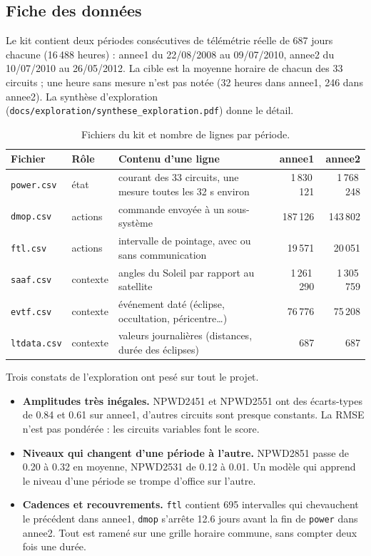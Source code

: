\documentclass[11pt,a4paper]{article}
\newcommand{\code}[1]{\texttt{#1}}
\begin{document}
\subsection{Fiche des données}

Le kit contient deux périodes consécutives de télémétrie réelle de 687 jours chacune (16\,488 heures) : annee1 du 22/08/2008 au 09/07/2010, annee2 du 10/07/2010 au 26/05/2012. La cible est la moyenne horaire de chacun des 33 circuits ; une heure sans mesure n'est pas notée (32 heures dans annee1, 246 dans annee2). La synthèse d'exploration (\code{docs/exploration/synthese\_exploration.pdf}) donne le détail.

\begin{table}[!htb]
\centering\small
\caption{Fichiers du kit et nombre de lignes par période.}
\label{tab:fichiers}
\begin{tabularx}{\linewidth}{l l X r r}
\toprule
Fichier & Rôle & Contenu d'une ligne & annee1 & annee2 \\
\midrule
\code{power.csv}  & état    & courant des 33 circuits, une mesure toutes les 32 s environ & 1\,830\,121 & 1\,768\,248 \\
\code{dmop.csv}   & actions & commande envoyée à un sous-système & 187\,126 & 143\,802 \\
\code{ftl.csv}    & actions & intervalle de pointage, avec ou sans communication & 19\,571 & 20\,051 \\
\code{saaf.csv}   & contexte & angles du Soleil par rapport au satellite & 1\,261\,290 & 1\,305\,759 \\
\code{evtf.csv}   & contexte & événement daté (éclipse, occultation, péricentre\ldots) & 76\,776 & 75\,208 \\
\code{ltdata.csv} & contexte & valeurs journalières (distances, durée des éclipses) & 687 & 687 \\
\bottomrule
\end{tabularx}
\end{table}

Trois constats de l'exploration ont pesé sur tout le projet.
\begin{itemize}
  \item \textbf{Amplitudes très inégales.} NPWD2451 et NPWD2551 ont des écarts-types de 0.84 et 0.61 sur annee1, d'autres circuits sont presque constants. La RMSE n'est pas pondérée : les circuits variables font le score.
  \item \textbf{Niveaux qui changent d'une période à l'autre.} NPWD2851 passe de 0.20 à 0.32 en moyenne, NPWD2531 de 0.12 à 0.01. Un modèle qui apprend le niveau d'une période se trompe d'office sur l'autre.
  \item \textbf{Cadences et recouvrements.} \code{ftl} contient 695 intervalles qui chevauchent le précédent dans annee1, \code{dmop} s'arrête 12.6 jours avant la fin de \code{power} dans annee2. Tout est ramené sur une grille horaire commune, sans compter deux fois une durée.
\end{itemize}
\end{document}
